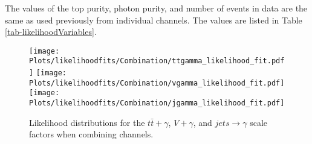 The values of the top purity, photon purity, and number of events in data are the same as used previously from individual channels. The values are listed in Table \ref{tab-likelihoodVariables}.  

\begin{figure}
\texttt{[image: Plots/likelihoodfits/Combination/ttgamma\_likelihood\_fit.pdf]}
\texttt{[image: Plots/likelihoodfits/Combination/vgamma\_likelihood\_fit.pdf]}
\texttt{[image: Plots/likelihoodfits/Combination/jgamma\_likelihood\_fit.pdf]}
\caption{Likelihood distributions for the $t\bar{t}+\gamma$, $V+\gamma$, and $jets\to \gamma$ scale factors when combining channels.}
\label{fig-SFLikelihoodFitsCombination}
\end{figure}